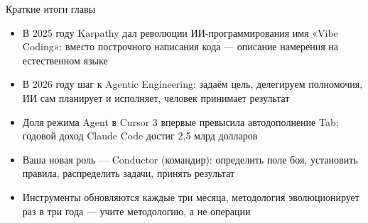 \begin{tcbsummary}{Краткие итоги главы}
\begin{itemize}
  \item В 2025 году Karpathy дал революции ИИ-программирования имя «Vibe Coding»: вместо построчного написания кода — описание намерения на естественном языке
  \item В 2026 году шаг к Agentic Engineering: задаём цель, делегируем полномочия, ИИ сам планирует и исполняет, человек принимает результат
  \item Доля режима Agent в Cursor 3 впервые превысила автодополнение Tab; годовой доход Claude Code достиг 2,5 млрд долларов
  \item Ваша новая роль — Conductor (командир): определить поле боя, установить правила, распределить задачи, принять результат
  \item Инструменты обновляются каждые три месяца, методология эволюционирует раз в три года — учите методологию, а не операции
\end{itemize}

\end{tcbsummary}
